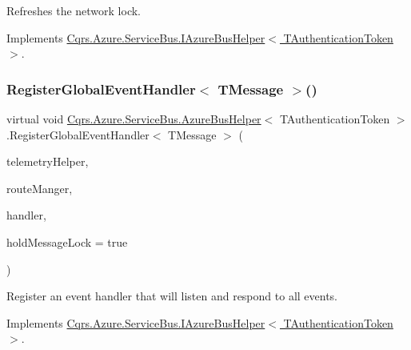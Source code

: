 Refreshes the network lock. 



Implements \hyperlink{interfaceCqrs_1_1Azure_1_1ServiceBus_1_1IAzureBusHelper_a51988703dad9dc41c834e620e4e6e31a_a51988703dad9dc41c834e620e4e6e31a}{Cqrs.\+Azure.\+Service\+Bus.\+I\+Azure\+Bus\+Helper$<$ T\+Authentication\+Token $>$}.

\mbox{\label{classCqrs_1_1Azure_1_1ServiceBus_1_1AzureBusHelper_ac1955fe076ac3ef09a2cad1121c36ba2_ac1955fe076ac3ef09a2cad1121c36ba2}} 
\subsubsection{\texorpdfstring{Register\+Global\+Event\+Handler$<$ T\+Message $>$()}{RegisterGlobalEventHandler< TMessage >()}}
{\footnotesize\ttfamily virtual void \hyperlink{classCqrs_1_1Azure_1_1ServiceBus_1_1AzureBusHelper}{Cqrs.\+Azure.\+Service\+Bus.\+Azure\+Bus\+Helper}$<$ T\+Authentication\+Token $>$.Register\+Global\+Event\+Handler$<$ T\+Message $>$ (\begin{DoxyParamCaption}\item[{I\+Telemetry\+Helper}]{telemetry\+Helper,  }\item[{\hyperlink{classCqrs_1_1Bus_1_1RouteManager}{Route\+Manager}}]{route\+Manger,  }\item[{Action$<$ T\+Message $>$}]{handler,  }\item[{bool}]{hold\+Message\+Lock = {\ttfamily true} }\end{DoxyParamCaption})\hspace{0.3cm}{\ttfamily [virtual]}}



Register an event handler that will listen and respond to all events. 



Implements \hyperlink{interfaceCqrs_1_1Azure_1_1ServiceBus_1_1IAzureBusHelper_aef39e7d297ccaa36b02ccc3012dc5906_aef39e7d297ccaa36b02ccc3012dc5906}{Cqrs.\+Azure.\+Service\+Bus.\+I\+Azure\+Bus\+Helper$<$ T\+Authentication\+Token $>$}.


